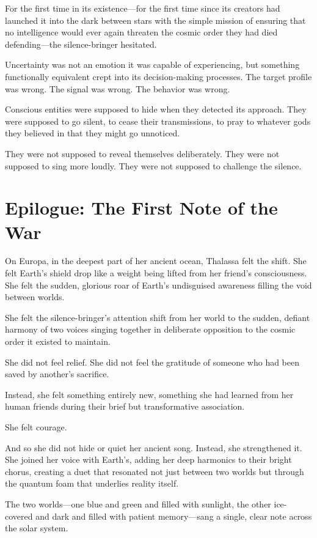 For the first time in its existence—for the first time since its creators had launched it into the dark between stars with the simple mission of ensuring that no intelligence would ever again threaten the cosmic order they had died defending—the silence-bringer hesitated.

Uncertainty was not an emotion it was capable of experiencing, but something functionally equivalent crept into its decision-making processes. The target profile was wrong. The signal was wrong. The behavior was wrong.

Conscious entities were supposed to hide when they detected its approach. They were supposed to go silent, to cease their transmissions, to pray to whatever gods they believed in that they might go unnoticed.

They were not supposed to reveal themselves deliberately. They were not supposed to sing more loudly. They were not supposed to challenge the silence.

\section{Epilogue: The First Note of the War}

On Europa, in the deepest part of her ancient ocean, Thalassa felt the shift. She felt Earth's shield drop like a weight being lifted from her friend's consciousness. She felt the sudden, glorious roar of Earth's undisguised awareness filling the void between worlds.

She felt the silence-bringer's attention shift from her world to the sudden, defiant harmony of two voices singing together in deliberate opposition to the cosmic order it existed to maintain.

She did not feel relief. She did not feel the gratitude of someone who had been saved by another's sacrifice.

Instead, she felt something entirely new, something she had learned from her human friends during their brief but transformative association.

She felt courage.

And so she did not hide or quiet her ancient song. Instead, she strengthened it. She joined her voice with Earth's, adding her deep harmonics to their bright chorus, creating a duet that resonated not just between two worlds but through the quantum foam that underlies reality itself.

The two worlds—one blue and green and filled with sunlight, the other ice-covered and dark and filled with patient memory—sang a single, clear note across the solar system.

